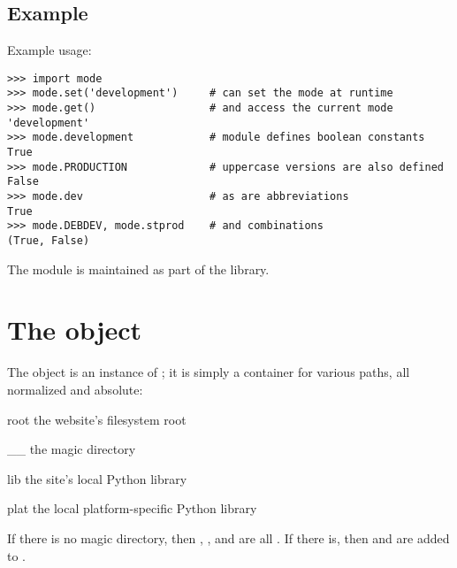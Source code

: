 \subsection{Example}

Example usage:

\begin{verbatim}
>>> import mode
>>> mode.set('development')     # can set the mode at runtime
>>> mode.get()                  # and access the current mode
'development'
>>> mode.development            # module defines boolean constants
True
>>> mode.PRODUCTION             # uppercase versions are also defined
False
>>> mode.dev                    # as are abbreviations
True
>>> mode.DEBDEV, mode.stprod    # and combinations
(True, False)
\end{verbatim}

\begin{seealso}

{}{The  module is maintained as part of the
 library.}

\end{seealso}


\section{The  object}
\label{api-paths}

The  object is an instance of
; it is simply a container for various paths,
all normalized and absolute:

\begin{memberdesc}[string]{root}
the website's filesystem root
\end{memberdesc}

\begin{memberdesc}[string]{__}
the magic directory
\end{memberdesc}

\begin{memberdesc}[string]{lib}
the site's local Python library
\end{memberdesc}

\begin{memberdesc}[string]{plat}
the local platform-specific Python library
\end{memberdesc}

If there is no magic directory, then \code{__}, , and  are
all . If there is, then  and  are added to
.
